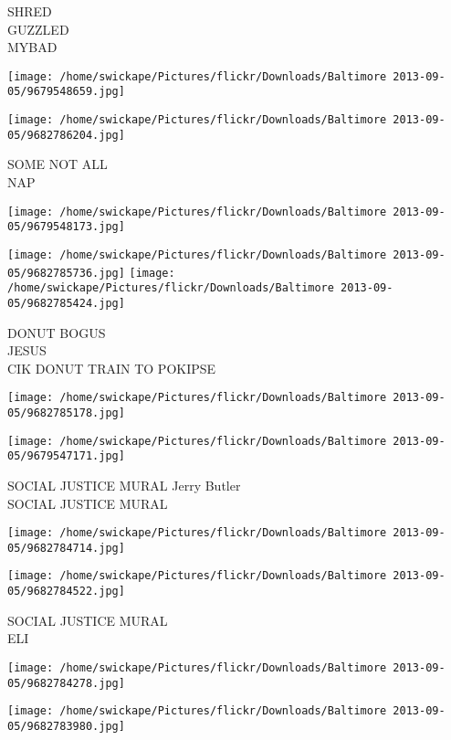 \documentclass[10pt,letterpaper]{article}
\begin{document}
SHRED\\
GUZZLED\\
MYBAD
\pagebreak

\texttt{[image: /home/swickape/Pictures/flickr/Downloads/Baltimore 2013-09-05/9679548659.jpg]}

\vspace{0.25in}
\texttt{[image: /home/swickape/Pictures/flickr/Downloads/Baltimore 2013-09-05/9682786204.jpg]}

SOME NOT ALL\\
NAP
\pagebreak

\texttt{[image: /home/swickape/Pictures/flickr/Downloads/Baltimore 2013-09-05/9679548173.jpg]}

\vspace{0.25in}
\texttt{[image: /home/swickape/Pictures/flickr/Downloads/Baltimore 2013-09-05/9682785736.jpg]}
\texttt{[image: /home/swickape/Pictures/flickr/Downloads/Baltimore 2013-09-05/9682785424.jpg]}

DONUT BOGUS\\
JESUS\\
CIK DONUT TRAIN TO POKIPSE
\pagebreak

\texttt{[image: /home/swickape/Pictures/flickr/Downloads/Baltimore 2013-09-05/9682785178.jpg]}

\vspace{0.25in}
\texttt{[image: /home/swickape/Pictures/flickr/Downloads/Baltimore 2013-09-05/9679547171.jpg]}

SOCIAL JUSTICE MURAL Jerry Butler\\
SOCIAL JUSTICE MURAL
\pagebreak

\texttt{[image: /home/swickape/Pictures/flickr/Downloads/Baltimore 2013-09-05/9682784714.jpg]}

\vspace{0.25in}
\texttt{[image: /home/swickape/Pictures/flickr/Downloads/Baltimore 2013-09-05/9682784522.jpg]}

SOCIAL JUSTICE MURAL\\
ELI
\pagebreak

\texttt{[image: /home/swickape/Pictures/flickr/Downloads/Baltimore 2013-09-05/9682784278.jpg]}

\vspace{0.25in}
\texttt{[image: /home/swickape/Pictures/flickr/Downloads/Baltimore 2013-09-05/9682783980.jpg]}
\end{document}
